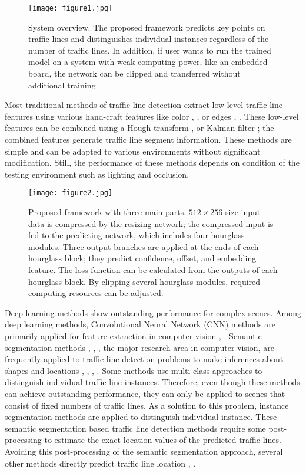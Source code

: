 \documentclass[journal]{IEEEtran}
\begin{document}
\begin{figure}
    \centering
    \texttt{[image: figure1.jpg]}
    \caption{System overview. The proposed framework predicts key points on traffic lines and distinguishes individual instances regardless of the number of traffic lines. In addition, if user wants to run the trained model on a system with weak computing power, like an embedded board, the network can be clipped and transferred without additional training.}
\end{figure}

Most traditional methods of traffic line detection extract low-level traffic line features using various hand-craft features like color \cite{1}, \cite{2}, or edges \cite{wang1998lane}, \cite{lee2018robust}. These low-level features can be combined using a Hough transform \cite{duda1972use}, \cite{9146381} or Kalman filter \cite{borkar2009robust}; the combined features generate traffic line segment information. These methods are simple and can be adapted to various environments without significant modification. Still, the performance of these methods depends on condition of the testing environment such as lighting and occlusion.

\begin{figure*}
    \centering
    \texttt{[image: figure2.jpg]}
    \caption{Proposed framework with three main parts. $512\times256$ size input data is compressed by the resizing network; the compressed input is fed to the predicting network, which includes four hourglass modules. Three output branches are applied at the ends of each hourglass block; they predict confidence, offset, and embedding feature. The loss function can be calculated from the outputs of each hourglass block. By clipping several hourglass modules, required computing resources can be adjusted.
}
\end{figure*}

Deep learning methods show outstanding performance for complex scenes. Among deep learning methods, Convolutional Neural Network (CNN) methods are primarily applied for feature extraction in computer vision \cite{krizhevsky2012imagenet}, \cite{he2017mask}. Semantic segmentation methods \cite{badrinarayanan2017segnet}, \cite{paszke2016enet}, \cite{ronneberger2015u}, the major research area in computer vision, are frequently applied to traffic line detection problems to make inferences about shapes and locations \cite{yang2019improved}, \cite{pan2018spatial}, \cite{van2019end}, \cite{zou2019robust}. Some methods use multi-class approaches to distinguish individual traffic line instances. Therefore, even though these methods can achieve outstanding performance, they can only be applied to scenes that consist of fixed numbers of traffic lines. As a solution to this problem, instance segmentation methods are applied to distinguish individual instance. These semantic segmentation based traffic line detection methods require some post-processing to estimate the exact location values of the predicted traffic lines. Avoiding this post-processing of the semantic segmentation approach, several other methods directly predict traffic line location \cite{chen2019pointlanenet}, \cite{8624563}. 
\end{document}
